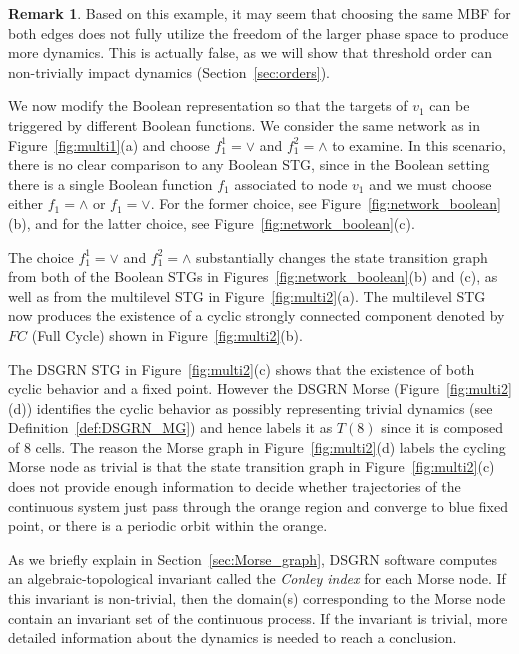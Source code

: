 \documentclass[12pt, notitlepage]{amsart}
\theoremstyle{definition}
\newtheorem{rem}[thm]{Remark}
\begin{document}
\begin{rem}
  Based on this example, it may seem that choosing the same MBF for both edges does not fully utilize the freedom of the larger phase space to produce more dynamics. This is actually false, as we will show that threshold order can non-trivially impact dynamics (Section~\ref{sec:orders}).
\end{rem}

We now modify the Boolean representation so that the targets of $v_1$ can be triggered by different Boolean functions. We consider the same network as in Figure~\ref{fig:multi1}(a) and choose $f_1^1= \vee$ and $f_1^2 = \wedge$ to examine. In this scenario, there is no clear comparison to any Boolean STG, since in the Boolean setting there is a single Boolean function $f_1$ associated to node $v_1$ and we must choose either $f_1 = \wedge$ or $f_1 = \vee$. For the former choice, see Figure~\ref{fig:network_boolean}(b), and for the latter choice, see Figure~\ref{fig:network_boolean}(c).

The choice $f_1^1= \vee$ and $f_1^2 = \wedge$ substantially changes the state transition graph from both of the Boolean STGs in Figures~\ref{fig:network_boolean}(b) and (c), as well as from the multilevel STG in Figure~\ref{fig:multi2}(a). The multilevel STG now produces the existence of a cyclic strongly connected component denoted by $FC$ (Full Cycle) shown in Figure~\ref{fig:multi2}(b).

The DSGRN STG in Figure~\ref{fig:multi2}(c) shows that the existence of both cyclic behavior and a fixed point. However the DSGRN Morse (Figure~\ref{fig:multi2}(d)) identifies the cyclic behavior as possibly representing trivial dynamics (see Definition~\ref{def:DSGRN_MG}) and hence labels it as $T(8)$ since it is composed of $8$ cells. The reason the Morse graph in Figure~\ref{fig:multi2}(d) labels the cycling Morse node as trivial is that the state transition graph in Figure~\ref{fig:multi2}(c) does not provide enough information to decide whether trajectories of the continuous system just pass through the orange region and converge to blue fixed point, or there is a periodic orbit within the orange.

As we briefly explain in Section~\ref{sec:Morse_graph}, DSGRN software computes an algebraic-topological invariant called the \textit{Conley index} for each Morse node. If this invariant is non-trivial, then the domain(s) corresponding to the Morse node contain an invariant set of the continuous process. If the invariant is trivial, more detailed information about the dynamics is needed to reach a conclusion.
\end{document}

